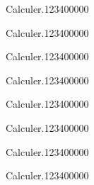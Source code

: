 \begin{pageParcoursd} 

\begin{ExoCd}{Calculer.}{1234}{0}{0}{0}{0}{0}

\end{ExoCd}
 
 
\begin{ExoCd}{Calculer.}{1234}{0}{0}{0}{0}{0}

\end{ExoCd}
 
 
\begin{ExoCd}{Calculer.}{1234}{0}{0}{0}{0}{0}

\end{ExoCd}
 
 
\begin{ExoCd}{Calculer.}{1234}{0}{0}{0}{0}{0}

\end{ExoCd} 


\end{pageParcoursd}
\begin{pageParcourst}

 \begin{ExoCt}{Calculer.}{1234}{0}{0}{0}{0}{0}

\end{ExoCt}
 
 
\begin{ExoCt}{Calculer.}{1234}{0}{0}{0}{0}{0}

\end{ExoCt}
 
 
\begin{ExoCt}{Calculer.}{1234}{0}{0}{0}{0}{0}

\end{ExoCt}
 
 
\begin{ExoCt}{Calculer.}{1234}{0}{0}{0}{0}{0}

\end{ExoCt} 


\end{pageParcourst}
